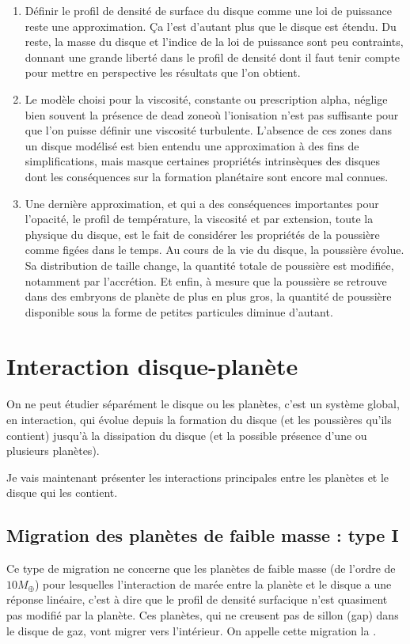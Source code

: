 \begin{enumerate}
\item Définir le profil de densité de surface du disque comme une loi de puissance reste une approximation. Ça l'est d'autant plus que le disque est étendu. Du reste, la masse du disque et l'indice de la loi de puissance sont peu contraints, donnant une grande liberté dans le profil de densité dont il faut tenir compte pour mettre en perspective les résultats que l'on obtient.
\item Le modèle choisi pour la viscosité, constante ou prescription alpha, néglige bien souvent la présence de \og dead zone\fg où l'ionisation n'est pas suffisante pour que l'on puisse définir une viscosité turbulente. L'absence de ces zones dans un disque modélisé est bien entendu une approximation à des fins de simplifications, mais masque certaines propriétés intrinsèques des disques dont les conséquences sur la formation planétaire sont encore mal connues.
\item Une dernière approximation, et qui a des conséquences importantes pour l'opacité, le profil de température, la viscosité et par extension, toute la physique du disque, est le fait de considérer les propriétés de la poussière comme figées dans le temps. Au cours de la vie du disque, la poussière évolue. Sa distribution de taille change, la quantité totale de poussière est modifiée, notamment par l'accrétion. Et enfin, à mesure que la poussière se retrouve dans des embryons de planète de plus en plus gros, la quantité de poussière disponible sous la forme de petites particules diminue d'autant. 
\end{enumerate}

\section{Interaction disque-planète}
On ne peut étudier séparément le disque ou les planètes, c'est un système global, en interaction, qui évolue depuis la formation du disque (et les poussières qu'ils contient) jusqu'à la dissipation du disque (et la possible présence d'une ou plusieurs planètes).

Je vais maintenant présenter les interactions principales entre les planètes et le disque qui les contient. 

\subsection{Migration des planètes de faible masse : type I}
Ce type de migration ne concerne que les planètes de faible masse (de l'ordre de $10M_{\oplus}$) pour lesquelles l'interaction de marée entre la planète et le disque a une réponse linéaire, c'est à dire que le profil de densité surfacique n'est quasiment pas modifié par la planète. Ces planètes, qui ne creusent pas de sillon (gap) dans le disque de gaz, vont migrer vers l'intérieur. On appelle cette migration la .

